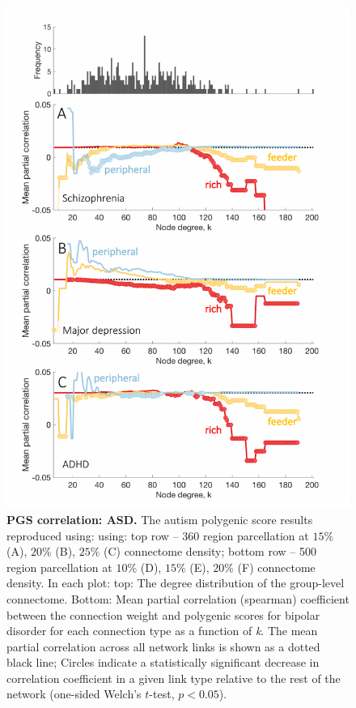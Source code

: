 \begin{figure}[h!]
\begin{center}
\includegraphics[width=1\textwidth]{Chapter5/SFigure6.pdf}%
\end{center}
\caption{\textbf{PGS correlation: ASD.} 
The autism polygenic score results reproduced using: using: top row -- 360 region parcellation at $15\%$ (A), $20\%$ (B), $25\%$ (C) connectome density; bottom row -- 500 region parcellation at $10\%$ (D), $15\%$ (E), $20\%$ (F) connectome density. In each plot: top: The degree distribution of the group-level connectome. Bottom: Mean partial correlation (spearman) coefficient between the connection weight and polygenic scores for bipolar disorder for each connection type as a function of \textit{k}. The mean partial correlation across all network links is shown as a dotted black line; Circles indicate a statistically significant decrease in correlation coefficient in a given link type relative to the rest of the network (one-sided Welch's $t$-test, $p < 0.05$).}
\label{fig:Ch5SFig6}
\end{figure}

